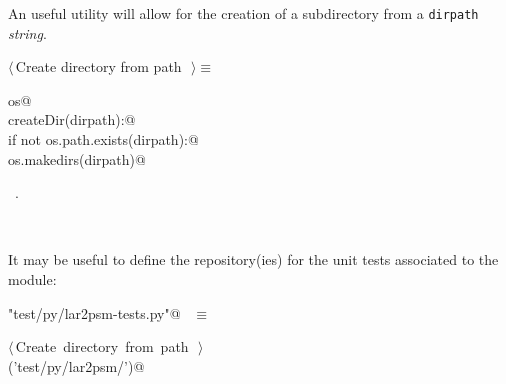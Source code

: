 \documentclass[11pt,oneside]{article}	%
\begin{document}
An useful utility will allow for the creation of a subdirectory from a \texttt{dirpath} \emph{string}.
\begin{flushleft} \small
\begin{minipage}{\linewidth} \label{scrap2}
$\langle\,$Create directory from path\nobreak\ {\footnotesize {}}$\,\rangle\equiv$
\vspace{-1ex}
\begin{list}{}{} \item
\mbox{}\verb@import os@\\
\mbox{}\verb@def createDir(dirpath):@\\
\mbox{}\verb@    if not os.path.exists(dirpath):@\\
\mbox{}\verb@        os.makedirs(dirpath)@\\
\mbox{}\verb@@{\NWsep}
\end{list}
\vspace{-1ex}
\footnotesize\addtolength{\baselineskip}{-1ex}
\begin{list}{}{\setlength{\itemsep}{-\parsep}\setlength{\itemindent}{-\leftmargin}}
\item \NWtxtMacroRefIn\ .
\end{list}
\end{minipage}\\[4ex]
\end{flushleft}

It may be useful to define the repository(ies) for the unit tests associated to the module:
\begin{flushleft} \small
\begin{minipage}{\linewidth} \label{scrap3}
\verb@"test/py/lar2psm-tests.py"@\nobreak\ {\footnotesize {} }$\equiv$
\vspace{-1ex}
\begin{list}{}{} \item
\mbox{}\verb@@\hbox{$\langle\,$Create directory from path\nobreak\ {\footnotesize {}}$\,\rangle$}\verb@@\\
\mbox{}\verb@createDir('test/py/lar2psm/')@\\
\mbox{}\verb@@{\NWsep}
\end{list}
\vspace{-2ex}
\end{minipage}\\[4ex]
\end{flushleft}
\end{document}

